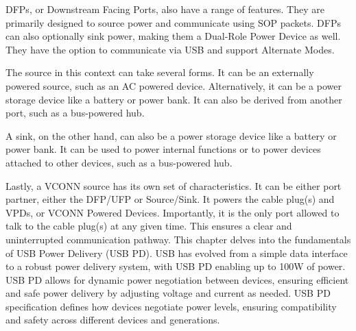 DFPs, or Downstream Facing Ports, also have a range of features. They are primarily designed to source power and communicate using SOP packets. DFPs can also optionally sink power, making them a Dual-Role Power Device as well. They have the option to communicate via USB and support Alternate Modes\cite{uma2}.

The source in this context can take several forms. It can be an externally powered source, such as an AC powered device. Alternatively, it can be a power storage device like a battery or power bank. It can also be derived from another port, such as a bus-powered hub\cite{bsk1}.

A sink, on the other hand, can also be a power storage device like a battery or power bank. It can be used to power internal functions or to power devices attached to other devices, such as a bus-powered hub\cite{Shy1}\cite{Skb1}.

Lastly, a VCONN source has its own set of characteristics. It can be either port partner, either the DFP/UFP or Source/Sink. It powers the cable plug(s) and VPDs, or VCONN Powered Devices. Importantly, it is the only port allowed to talk to the cable plug(s) at any given time. This ensures a clear and uninterrupted communication pathway\cite{hvr1}\cite{hvr2}.
\vspace{3cm}
This chapter delves into the fundamentals of USB Power Delivery (USB PD). USB has evolved from a simple data interface to a robust power delivery system, with USB PD enabling up to 100W of power. USB PD allows for dynamic power negotiation between devices, ensuring efficient and safe power delivery by adjusting voltage and current as needed. USB PD specification defines how devices negotiate power levels, ensuring compatibility and safety across different devices and generations.